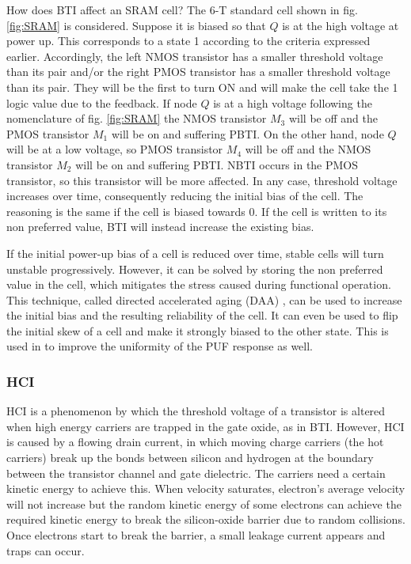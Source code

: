 How does BTI affect an SRAM cell? The 6-T standard cell shown in fig. \ref{fig:SRAM} is considered. Suppose it is biased so that $Q$ is at the high voltage at power up. This corresponds to a state 1 according to the criteria expressed earlier. Accordingly, the left NMOS transistor has a smaller threshold voltage than its pair and/or the right PMOS transistor has a smaller threshold voltage than its pair. They will be the first to turn ON and will make the cell take the 1 logic value due to the feedback. If node $Q$ is at a high voltage following the nomenclature of fig. \ref{fig:SRAM} the NMOS transistor $M_3$ will be off and the PMOS transistor $M_1$ will be on and suffering PBTI.  On the other hand, node $Q$ will be at a low voltage, so PMOS transistor $M_4$ will be off and the NMOS transistor $M_2$ will be on and suffering PBTI. NBTI occurs in the PMOS transistor, so this transistor will be more affected. In any case, threshold voltage increases over time, consequently reducing the initial bias of the cell. The reasoning is the same if the cell is biased towards 0. If the cell is written to its non preferred value, BTI will instead increase the existing bias. 

If the initial power-up bias of a cell is reduced over time, stable cells will turn unstable progressively. However, it can be solved by storing the non preferred value in the cell, which mitigates the stress caused during functional operation. This technique, called directed accelerated aging (DAA) \cite{Roelke2018}, can be used to increase the initial bias and the resulting reliability of the cell. It can even be used to flip the initial skew of a cell and make it strongly biased to the other state. This is used in \cite{Garg2014} to improve the uniformity of the PUF response as well. 



\subsubsection{HCI}

HCI is a phenomenon by which the threshold voltage of a transistor is altered when high energy carriers are trapped in the gate oxide, as in BTI. However, HCI is caused by a flowing drain current, in which moving charge carriers (the hot carriers) break up the bonds between silicon and hydrogen at the boundary between the transistor channel and gate dielectric. The carriers need a certain kinetic energy to achieve this. When velocity saturates, electron's average velocity will not increase but the random kinetic energy of some electrons can achieve the required kinetic energy to break the silicon-oxide barrier due to random collisions. Once electrons start to break the barrier, a small leakage current appears and traps can occur.

